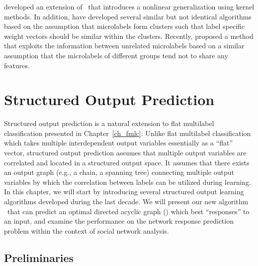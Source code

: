 {\citet{Argyriou08convex} developed an extension of \mtl\ that introduces a nonlinear generalization using kernel methods.
In addition, \citet{Argyriou08an,Jacob09cluster} have developed several similar but not identical algorithms based on the assumption that microlabels form clusters such that label specific weight vectors should be similar within the clusters.
Recently, \citet{Paredes12exploit} proposed a method that exploits the information between unrelated microlabels based on a similar assumption that the microlabels of different groups tend not to share any features.




%
%
\chapter{Structured Output Prediction} \label{ch_sop}

Structured output prediction is a natural extension to flat multilabel classification presented in Chapter~\ref{ch_fmlc}.
Unlike flat multilabel classification which takes multiple interdependent output variables essentially as a ``flat'' vector, structured output prediction assumes that multiple output variables are correlated and located in a structured output space.
It assumes that there exists an output graph (e.g., a chain, a spanning tree) connecting multiple output variables by which the correlation between labels can be utilized during learning.
In this chapter, we will start by introducing several structured output learning algorithms developed during the last decade.
We will present our new algorithm \spin\ that can predict an optimal directed acyclic graph (\daggraph) which best ``responses'' to an input, and examine the performance on the network response prediction problem within the context of social network analysis.



%
%
\section{Preliminaries}

}
